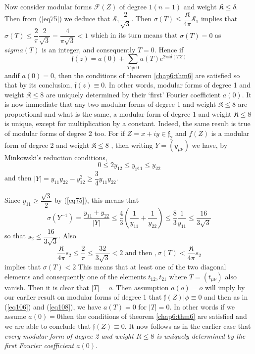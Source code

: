 Now consider modular forms $\mathcal{F} (Z)$ of degree $1(n = 1)$ and
weight $\mathfrak{K} \leq \delta$. Then from (\ref{eq75}) we deduce that
$\mathscr{S}_1 \dfrac{2}{\sqrt{3}}$. Then $\sigma(T) \leq
\dfrac{\mathfrak{K}}{4 \pi}\mathscr{S}_1$ implies that $\sigma(T) \leq
\dfrac{2}{\pi} \dfrac{2}{\sqrt{3}} =\dfrac{4}{\pi \sqrt{3}}<1$ which
in its turn means that $\sigma (T) = 0$ as $sigma (T) $ is an integer,
and consequently $T =0$. Hence if  
$$
\mathfrak{f} (z) = a (0) + \sum_{T \neq 0} a (T) e^{2 \pi i \delta
  (TZ)} 
$$
and\pageoriginale if $a (0) = 0$, then the conditions of theorem
\ref{chap6:thm6} are satisfied 
so that by its conclusion, $\mathfrak{f} (z) \equiv 0$. In other words,
modular forms of degree 1 and weight $\mathfrak{K} \leq 8$ are
uniquely determined by their `first' Fourier coefficient $a(0)$. It is
now immediate that any two modular forms of degree 1 and weight
$\mathfrak{K} \leq 8$ are proportional and what is the same, a modular
form of degree 1 and weight $\mathfrak{K} \leq 8$ is unique, except
for multiplication by a constant. Indeed, the same result is true of
modular forms of degree 2 too. For if $Z = x + i y \in
\mathfrak{f}_2$ and $f(Z)$ is a modular form of degree 2 and weight
$\mathfrak{K} \leq 8$ , then writing $Y = (y_{\mu \nu})$ we have, by
Minkowski's reduction conditions, 
$$
0 \leq  2y_{12} \leq y_{y11} \leq y_{22}
$$
and then $|Y| = y_{11} y_{22 } - y^2_{12} \geq \dfrac{3}{4} y_{11} y_{22}$.

Since $y_{11} \geq \dfrac{\sqrt{3}}{2}$ by (\ref{eq75}), this means that  
$$
\sigma(Y^{-1}) = \frac{y_{11} + y_{22}}{|Y|} \leq
\frac{4}{3}(\frac{1}{y_{11}} + \frac{1}{y_{22}}) \leq \frac{8}{3}
\frac{1}{y_{11}} \leq \frac{16}{3 \sqrt{3}} 
$$
so that $s_2 \leq \dfrac{16}{3 \sqrt{3}}$. Also  
$$
\frac{\mathfrak{K}}{4 \pi} s_2 \leq \frac{2}{\pi} \leq \frac{32}{3
  \sqrt{3}} < 2 \text{ and then }, \sigma (T) < \frac{\mathfrak{K}}{4
  \pi} s_2 
$$
implies that $\sigma (T) < 2$ This means that at least one of the two
diagonal elements and consequently one of the elements $t_{12},
t_{21}$ where $T= (t_{\mu \nu})$ also vanish. Then it is clear that
$|T|=o$. Then assumption $a (o) =o$ will imply by our earlier result
on modular forms of degree 1 that $\mathfrak{f}(Z)| \phi \equiv 0$
and then as in (\ref{eq106}) and (\ref{eq108}), we have $a(T) =0$ for
$|T| =0$. In 
other words if we assume $a(0) =0$\pageoriginale then the conditions
of theorem \ref{chap6:thm6}  
are satisfied and we are able to conclude that $\mathfrak{f}(Z)
\equiv 0$. It now follows as in the earlier case that \textit{every
  modular form of degree 2 and weight $R \leq 8$ is uniquely determined
  by the first Fourier coefficient $a(0)$}. 

